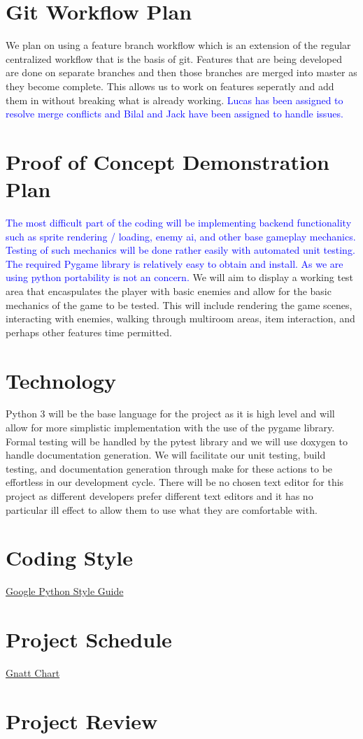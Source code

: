 \documentclass{article}
\begin{document}
\section{Git Workflow Plan}

We plan on using a feature branch workflow which is an extension of the regular centralized workflow that is the basis of git. Features that are being developed are done on separate branches and then those branches are merged into master as they become complete. This allows us to work on features seperatly and add them in without breaking what is already working. \textcolor{blue}{Lucas has been assigned to resolve merge conflicts and Bilal and Jack have been assigned to handle issues.}

\section{Proof of Concept Demonstration Plan}

\textcolor{blue}{The most difficult part of the coding will be implementing backend functionality such as sprite rendering / loading, enemy ai, and other base gameplay mechanics. Testing of such mechanics will be done rather easily with automated unit testing. The required Pygame library is relatively easy to obtain and install. As we are using python portability is not an concern.} We will aim to display a working test area that encaspulates the player with basic enemies and allow for the basic mechanics of the game to be tested. This will include rendering the game scenes, interacting with enemies, walking through multiroom areas, item interaction, and perhaps other features time permitted. 

\section{Technology}

Python 3 will be the base language for the project as it is high level and will allow for more simplistic implementation with the use of the pygame library. Formal testing will be handled by the pytest library and we will use doxygen to handle documentation generation. We will facilitate our unit testing, build testing, and documentation generation through make for these actions to be effortless in our development cycle. There will be no chosen text editor for this project as different developers prefer different text editors and it has no particular ill effect to allow them to use what they are comfortable with.

\section{Coding Style}

\href{https://github.com/google/styleguide}{Google Python Style Guide}

\section{Project Schedule}

\href{https://gitlab.cas.mcmaster.ca/zacharel/pyDroid/tree/master/ProjectSchedule/Group1_Gantt_Rev0.pdf}{Gnatt Chart}

\section{Project Review}
\end{document}
